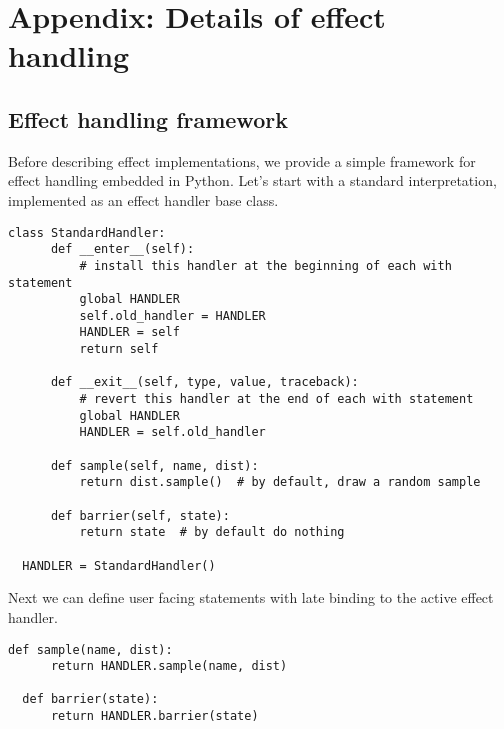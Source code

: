 \documentclass[anonymous=false, %
               format=acmsmall, %
               review=true, %
               screen=true, %
               nonacm=true]{acmart}
\begin{document}



\section{Appendix: Details of effect handling}

\subsection{Effect handling framework}
Before describing effect implementations, we provide a simple framework for effect handling embedded in Python.
Let's start with a standard interpretation, implemented as an effect handler base class.
\begin{Verbatim}[samepage=true]
  class StandardHandler:
      def __enter__(self):
          # install this handler at the beginning of each with statement
          global HANDLER
          self.old_handler = HANDLER
          HANDLER = self
          return self

      def __exit__(self, type, value, traceback):
          # revert this handler at the end of each with statement
          global HANDLER
          HANDLER = self.old_handler

      def sample(self, name, dist):
          return dist.sample()  # by default, draw a random sample

      def barrier(self, state):
          return state  # by default do nothing

  HANDLER = StandardHandler()
\end{Verbatim}
Next we can define user facing statements with late binding to the active effect handler.
\begin{Verbatim}[samepage=true]
  def sample(name, dist):
      return HANDLER.sample(name, dist)

  def barrier(state):
      return HANDLER.barrier(state)
\end{Verbatim}
\end{document}
